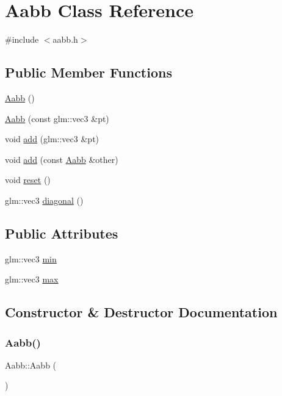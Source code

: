 \hypertarget{class_aabb}{}\section{Aabb Class Reference}
\label{class_aabb}


{\ttfamily \#include $<$aabb.\+h$>$}

\subsection*{Public Member Functions}
\begin{DoxyCompactItemize}
\item 
\mbox{\hyperlink{class_aabb_a74389a7e5d78c422088a3fe6db3fe60e}{Aabb}} ()
\item 
\mbox{\hyperlink{class_aabb_a4123e8cc3781096f097a726f2e616fc6}{Aabb}} (const glm\+::vec3 \&pt)
\item 
void \mbox{\hyperlink{class_aabb_ab7436a30136da670d0ef556c5a18ff65}{add}} (glm\+::vec3 \&pt)
\item 
void \mbox{\hyperlink{class_aabb_a021412b1faf38a1c576748ff830dd76c}{add}} (const \mbox{\hyperlink{class_aabb}{Aabb}} \&other)
\item 
void \mbox{\hyperlink{class_aabb_ab073c1ddcdb3286fc98bdbed961340a3}{reset}} ()
\item 
glm\+::vec3 \mbox{\hyperlink{class_aabb_a597f28309e6373c3fc3a52ead55bd1e1}{diagonal}} ()
\end{DoxyCompactItemize}
\subsection*{Public Attributes}
\begin{DoxyCompactItemize}
\item 
glm\+::vec3 \mbox{\hyperlink{class_aabb_a7ec292dc1a179e674a6a826feefcfeea}{min}}
\item 
glm\+::vec3 \mbox{\hyperlink{class_aabb_a4c29c5fabf6e182ede1fa963b745bba0}{max}}
\end{DoxyCompactItemize}


\subsection{Constructor \& Destructor Documentation}
\mbox{\label{class_aabb_a74389a7e5d78c422088a3fe6db3fe60e}} 
\subsubsection{\texorpdfstring{Aabb()}{Aabb()}\hspace{0.1cm}{\footnotesize\ttfamily [1/2]}}
{\footnotesize\ttfamily Aabb\+::\+Aabb (\begin{DoxyParamCaption}{ }\end{DoxyParamCaption})\hspace{0.3cm}{\ttfamily [inline]}}

